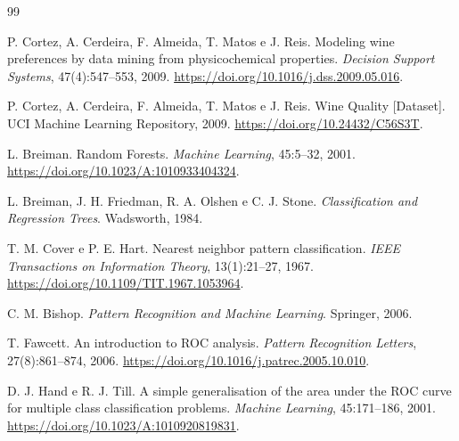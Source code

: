 \documentclass[12pt,a4paper]{article}
\begin{document}
\begin{thebibliography}{99}

P. Cortez, A. Cerdeira, F. Almeida, T. Matos e J. Reis.
\newblock Modeling wine preferences by data mining from physicochemical properties.
\newblock \textit{Decision Support Systems}, 47(4):547--553, 2009.
\newblock \url{https://doi.org/10.1016/j.dss.2009.05.016}.

P. Cortez, A. Cerdeira, F. Almeida, T. Matos e J. Reis.
\newblock Wine Quality [Dataset].
\newblock UCI Machine Learning Repository, 2009.
\newblock \url{https://doi.org/10.24432/C56S3T}.

L. Breiman.
\newblock Random Forests.
\newblock \textit{Machine Learning}, 45:5--32, 2001.
\newblock \url{https://doi.org/10.1023/A:1010933404324}.

L. Breiman, J. H. Friedman, R. A. Olshen e C. J. Stone.
\newblock \textit{Classification and Regression Trees}.
\newblock Wadsworth, 1984.

T. M. Cover e P. E. Hart.
\newblock Nearest neighbor pattern classification.
\newblock \textit{IEEE Transactions on Information Theory}, 13(1):21--27, 1967.
\newblock \url{https://doi.org/10.1109/TIT.1967.1053964}.

C. M. Bishop.
\newblock \textit{Pattern Recognition and Machine Learning}.
\newblock Springer, 2006.

T. Fawcett.
\newblock An introduction to ROC analysis.
\newblock \textit{Pattern Recognition Letters}, 27(8):861--874, 2006.
\newblock \url{https://doi.org/10.1016/j.patrec.2005.10.010}.

D. J. Hand e R. J. Till.
\newblock A simple generalisation of the area under the ROC curve for multiple class classification problems.
\newblock \textit{Machine Learning}, 45:171--186, 2001.
\newblock \url{https://doi.org/10.1023/A:1010920819831}.

\end{thebibliography}
\end{document}
